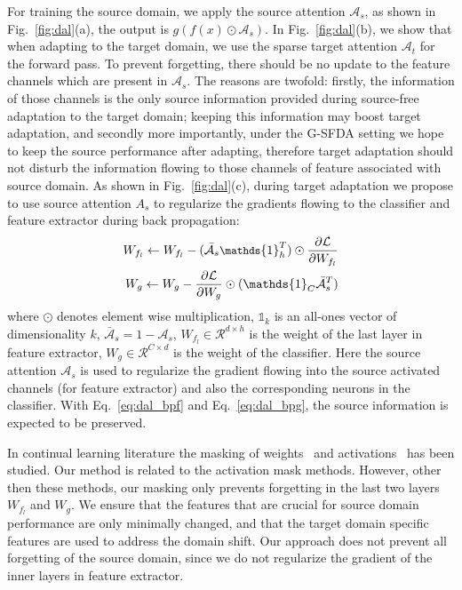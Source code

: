 \documentclass[10pt,twocolumn,letterpaper]{article}
\begin{document}
For training the source domain, we apply the source attention $\mathcal{A}_s$, as shown in Fig.~\ref{fig:dal}(a), the output is $g(f(x) \odot \mathcal{A}_s)$. 
In Fig.~\ref{fig:dal}(b), we show that when adapting to the target domain, we use the sparse target attention $\mathcal{A}_t$ for the forward pass. To prevent forgetting, there should be no update to the feature channels which are present in $\mathcal{A}_s$. The reasons are twofold: firstly, the information of those channels is the only source information provided during source-free adaptation to the target domain; keeping this information may boost target adaptation, and secondly more importantly, under the G-SFDA setting we hope to keep the source performance after adapting,  therefore target adaptation should not disturb the information flowing to those channels of feature associated with source domain. As shown in Fig.~\ref{fig:dal}(c), during target adaptation we propose to use source attention $A_s$ to regularize the gradients flowing to the classifier and feature extractor during back propagation:
\begin{eqnarray}\label{eq:dal_bpf}
\small
	W_{f_l}\leftarrow W_{f_l} - (\bar{\mathcal A}_s\mathds{1}_{h}^{T}) \odot \frac{\partial \mathcal{L}}{\partial W_{f_l}}\\\label{eq:dal_bpg}
	W_{g}\leftarrow W_{g} -   \frac{\partial \mathcal{L}}{\partial W_{g}} \odot (\mathds{1}_{C}\bar{\mathcal A}_s^T)
\end{eqnarray}
where $\odot$ denotes element wise multiplication, $\mathds{1}_{k}$ is an all-ones vector of dimensionality $k$, $\bar{\mathcal A}_s=1-{\mathcal A}_s$, $W_{f_l} \in \mathcal{R}^{d \times h}$ is the weight of the last layer in feature extractor, $W_{g} \in \mathcal{R}^{C \times d}$ is the weight of the classifier. Here the source attention $\mathcal{A}_s$ is used to regularize the gradient flowing into the source activated channels (for feature extractor) and also the corresponding neurons in the classifier. With Eq.~\ref{eq:dal_bpf} and Eq.~\ref{eq:dal_bpg}, the source information is expected to be preserved.

In continual learning literature the masking of weights~\cite{mallya2018piggyback,mallya2018packnet} and activations~\cite{abati2020conditional,masana2021ternary,serra2018overcoming} has been studied. Our method is related to the activation mask methods. However, other then these methods, our masking only prevents forgetting in the last two layers $W_{f_l}$ and $W_g$.
We ensure that the features that are crucial for source domain performance are only minimally changed, and that the target domain specific features are used to address the domain shift. Our approach does not prevent all forgetting of the source domain, since we do not regularize the gradient of the inner layers in feature extractor.
\end{document}
